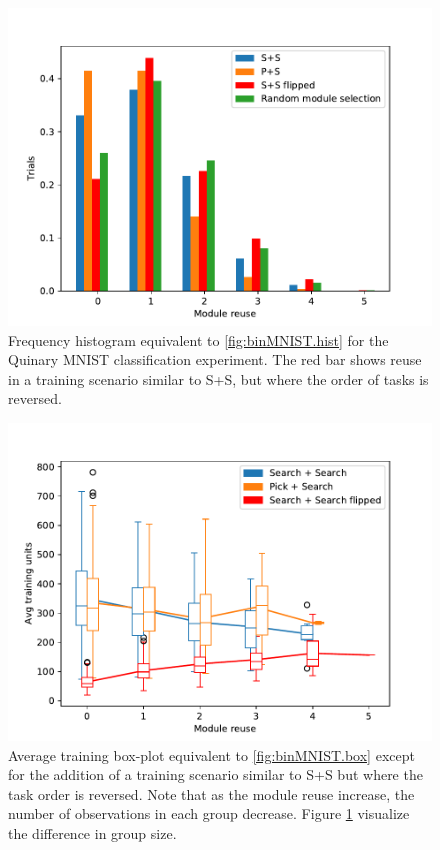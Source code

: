 \begin{figure}[t]
    \includegraphics[width=\textwidth]{Chapters/4.Experiments/exp1/figures/QUIN_module_reuse.pdf}
    \caption[Module reuse for quinary MNIST classification]{Frequency histogram equivalent to \ref{fig:binMNIST.hist} for the Quinary MNIST classification experiment. The red bar shows reuse in a training scenario similar to S+S, but where the order of tasks is reversed.}
    \label{fig:quinMNIST.hist}
\end{figure}

\begin{figure}[t]
    \includegraphics[width=\textwidth]{Chapters/4.Experiments/exp1/figures/QUIN_training_boxplot.pdf}
    \caption[Training boxplot for quinary MNIST classification]{Average training box-plot equivalent to \ref{fig:binMNIST.box} except for the addition of a training scenario similar to S+S but where the task order is reversed. Note that as the module reuse increase, the number of observations in each group decrease. Figure \ref{fig:quinMNIST.hist} visualize the difference in group size.}
    \label{fig:quinMNIST.box}
\end{figure}


